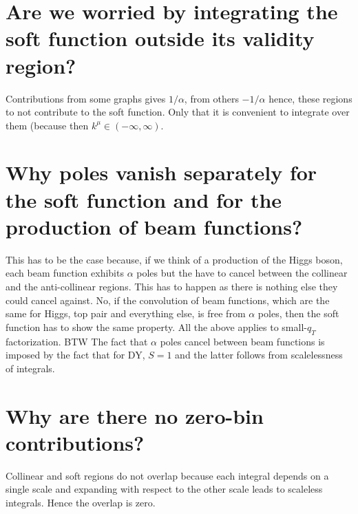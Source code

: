 \documentclass[a4paper,11pt]{report}
\numberwithin{equation}{section}
\begin{document}
\section*{Are we worried by integrating the soft function outside its
validity region?}

Contributions from some graphs gives $1/\alpha$, from others $-1/\alpha$ hence,
these regions to not contribute to the soft function. Only that it is convenient
to integrate over them (because then $k^\mu \in (-\infty,\infty)$.


\section*{Why \boldmath{$\alpha$} poles vanish separately for the soft function and for the production of beam functions?}

This has to be the case because, if we think of a production of the Higgs boson,
each beam function exhibits $\alpha$ poles but the have to cancel between the
collinear and the anti-collinear regions. This has to happen as there is nothing
else they could cancel against. No, if the convolution of beam functions, which
are the same for Higgs, top pair and everything else, is free
from $\alpha$ poles, then the soft function has to show the same property. All
the above applies to small-$q_T$ factorization. BTW The fact that $\alpha$ poles
cancel between beam functions is imposed by the fact that for DY, $S = 1$ and
the latter follows from scalelessness of integrals.

%
% 

\section*{Why are there no zero-bin contributions?}

Collinear and soft regions do not overlap because each integral depends on a
single scale and expanding with respect to the other scale leads to scaleless
integrals. Hence the overlap is zero.


\end{document}
